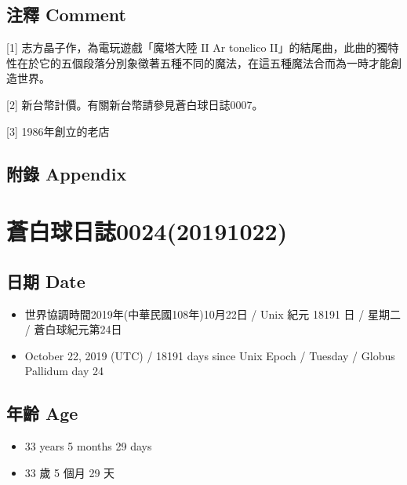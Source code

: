 \documentclass[a5paper, 12pt
]{book}
\providecommand{\tightlist}{%
  \setlength{\itemsep}{0pt}\setlength{\parskip}{0pt}}
\begin{document}
\hypertarget{ux6ce8ux91cb-comment-16}{%
\subsection{注釋 Comment}\label{ux6ce8ux91cb-comment-16}}

{[}1{]} 志方晶子作，為電玩遊戲「魔塔大陸 II Ar tonelico
II」的結尾曲，此曲的獨特性在於它的五個段落分別象徵著五種不同的魔法，在這五種魔法合而為一時才能創造世界。

{[}2{]} 新台幣計價。有關新台幣請參見蒼白球日誌0007。

{[}3{]} 1986年創立的老店

\hypertarget{ux9644ux9304-appendix-15}{%
\subsection{附錄 Appendix}\label{ux9644ux9304-appendix-15}}

\hypertarget{ux84bcux767dux7403ux65e5ux8a8c002420191022}{%
\section{蒼白球日誌0024(20191022)}\label{ux84bcux767dux7403ux65e5ux8a8c002420191022}}

\hypertarget{ux65e5ux671f-date-23}{%
\subsection{日期 Date}\label{ux65e5ux671f-date-23}}

\begin{itemize}
\tightlist
\item
  世界協調時間2019年(中華民國108年)10月22日 / Unix 紀元 18191 日 /
  星期二 / 蒼白球紀元第24日
\item
  October 22, 2019 (UTC) / 18191 days since Unix Epoch / Tuesday /
  Globus Pallidum day 24
\end{itemize}

\hypertarget{ux5e74ux9f61-age-23}{%
\subsection{年齡 Age}\label{ux5e74ux9f61-age-23}}

\begin{itemize}
\tightlist
\item
  33 years 5 months 29 days
\item
  33 歲 5 個月 29 天
\end{itemize}
\end{document}
